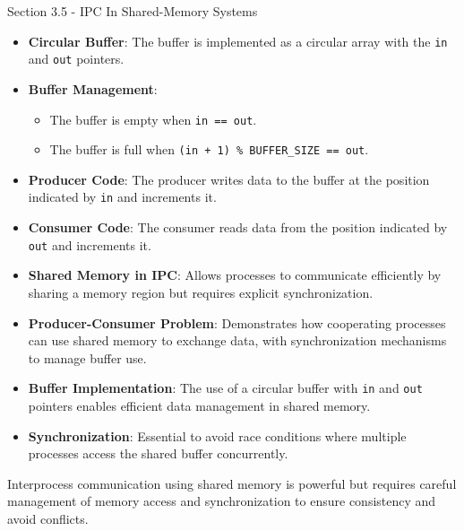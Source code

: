 \begin{notes}{Section 3.5 - IPC In Shared-Memory Systems}
\begin{highlight}
        \begin{itemize}
            \item \textbf{Circular Buffer}: The buffer is implemented as a circular array with the \texttt{in} and \texttt{out} pointers.
            \item \textbf{Buffer Management}: 
                \begin{itemize}
                    \item The buffer is empty when \texttt{in == out}.
                    \item The buffer is full when \texttt{(in + 1) \% BUFFER\_SIZE == out}.
                \end{itemize}
            \item \textbf{Producer Code}: The producer writes data to the buffer at the position indicated by \texttt{in} and increments it.
            \item \textbf{Consumer Code}: The consumer reads data from the position indicated by \texttt{out} and increments it.
        \end{itemize}
    
    \end{highlight}
    
    \begin{highlight}
    
        \begin{itemize}
            \item \textbf{Shared Memory in IPC}: Allows processes to communicate efficiently by sharing a memory region but requires explicit synchronization.
            \item \textbf{Producer-Consumer Problem}: Demonstrates how cooperating processes can use shared memory to exchange data, with synchronization mechanisms to manage buffer use.
            \item \textbf{Buffer Implementation}: The use of a circular buffer with \texttt{in} and \texttt{out} pointers enables efficient data management in shared memory.
            \item \textbf{Synchronization}: Essential to avoid race conditions where multiple processes access the shared buffer concurrently.
        \end{itemize}
    
    Interprocess communication using shared memory is powerful but requires careful management of memory access and synchronization to ensure consistency and avoid conflicts.
    
    \end{highlight}
\end{notes}

